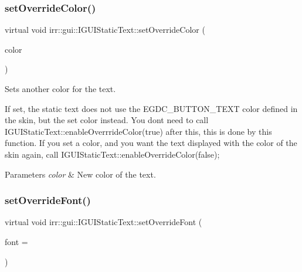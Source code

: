 \subsubsection{\texorpdfstring{set\+Override\+Color()}{setOverrideColor()}\hspace{0.1cm}{\footnotesize\ttfamily [2/2]}}
{\footnotesize\ttfamily virtual void irr\+::gui\+::\+I\+G\+U\+I\+Static\+Text\+::set\+Override\+Color (\begin{DoxyParamCaption}\item[{\hyperlink{classirr_1_1video_1_1SColor}{video\+::\+S\+Color}}]{color }\end{DoxyParamCaption})\hspace{0.3cm}{\ttfamily [pure virtual]}}



Sets another color for the text. 

If set, the static text does not use the E\+G\+D\+C\+\_\+\+B\+U\+T\+T\+O\+N\+\_\+\+T\+E\+XT color defined in the skin, but the set color instead. You don\textquotesingle{}t need to call I\+G\+U\+I\+Static\+Text\+::enable\+Overrride\+Color(true) after this, this is done by this function. If you set a color, and you want the text displayed with the color of the skin again, call I\+G\+U\+I\+Static\+Text\+::enable\+Override\+Color(false); 
\begin{DoxyParams}{Parameters}
{\em color} & New color of the text. \\
\hline
\end{DoxyParams}
\mbox{\label{classirr_1_1gui_1_1IGUIStaticText_ae3f65780d10979eb323ee7310cff7396}} 
\subsubsection{\texorpdfstring{set\+Override\+Font()}{setOverrideFont()}\hspace{0.1cm}{\footnotesize\ttfamily [1/2]}}
{\footnotesize\ttfamily virtual void irr\+::gui\+::\+I\+G\+U\+I\+Static\+Text\+::set\+Override\+Font (\begin{DoxyParamCaption}\item[{\hyperlink{classirr_1_1gui_1_1IGUIFont}{I\+G\+U\+I\+Font} $\ast$}]{font = {} }\end{DoxyParamCaption})\hspace{0.3cm}{\ttfamily [pure virtual]}}



